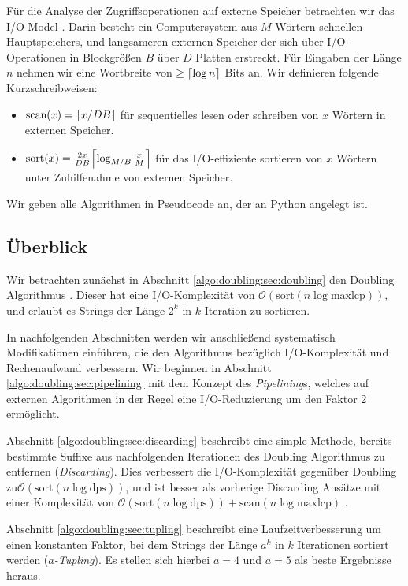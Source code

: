 Für die Analyse der Zugriffsoperationen auf externe Speicher betrachten wir das I/O-Model \cite{Vitter1994}. Darin besteht ein Computersystem aus $M$ Wörtern schnellen Hauptspeichers, und langsameren externen Speicher der sich über I/O-Operationen in Blockgrößen $B$ über $D$ Platten erstreckt. Für Eingaben der Länge $n$ nehmen wir eine Wortbreite von $\geq \ceil*{\log n}$ Bits an. Wir definieren folgende Kurzschreibweisen:
\begin{itemize}
\item $\text{scan}(x) = \ceil*{x/DB}$ für sequentielles lesen oder schreiben von $x$ Wörtern in externen Speicher.
\item $\text{sort}(x) = \frac{2x}{DB}\ceil*{\log_{M/B}\frac{x}{M}}$ für das I/O-effiziente sortieren von $x$ Wörtern unter Zuhilfenahme von externen Speicher.
\end{itemize}

Wir geben alle Algorithmen in Pseudocode an, der an Python angelegt ist.

\subsection{Überblick}

Wir betrachten zunächst in Abschnitt \ref{algo:doubling:sec:doubling} den Doubling Algorithmus \cite{Arge1997}\cite{Crauser2002}. Dieser hat eine I/O-Komplexität von $\mathcal{O}(\text{sort}(n \log \text{maxlcp}))$, und erlaubt es Strings der Länge $2^k$ in $k$ Iteration zu sortieren.

In nachfolgenden Abschnitten werden wir anschließend systematisch Modifikationen einführen, die den Algorithmus bezüglich I/O-Komplexität und Rechenaufwand verbessern. Wir beginnen in Abschnitt \ref{algo:doubling:sec:pipelining} mit dem Konzept des \textit{Pipelining}s, welches auf externen Algorithmen in der Regel eine I/O-Reduzierung um den Faktor 2 ermöglicht.

Abschnitt \ref{algo:doubling:sec:discarding} beschreibt eine simple Methode, bereits bestimmte Suffixe aus nachfolgenden Iterationen des Doubling Algorithmus zu entfernen (\textit{Discarding}). Dies verbessert die I/O-Komplexität gegenüber Doubling zu\newline $\mathcal{O}(\text{sort}(n \log \text{dps}))$, und ist besser als vorherige Discarding Ansätze mit einer Komplexität von $\mathcal{O}(\text{sort}(n \log \text{dps})) + \text{scan}(n \log \text{maxlcp})$ \cite{Crauser2002}.

Abschnitt \ref{algo:doubling:sec:tupling} beschreibt eine Laufzeitverbesserung um einen konstanten Faktor, bei dem Strings der Länge $a^k$ in $k$ Iterationen sortiert werden (\textit{$a$-Tupling}). Es stellen sich hierbei $a = 4$ und $a = 5$ als beste Ergebnisse heraus.

